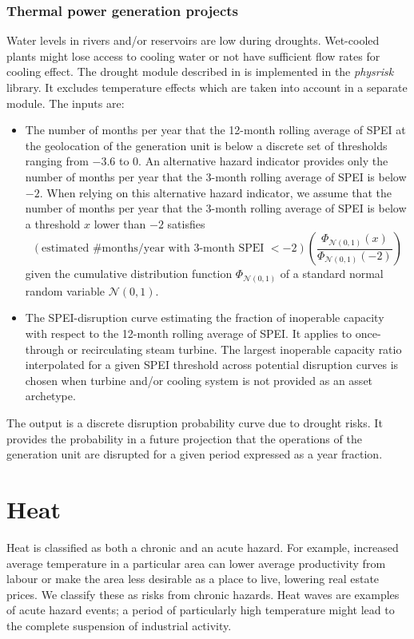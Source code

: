\documentclass[a4paper,11pt]{extarticle} %
\theoremstyle{definition}
\begin{document}
\subsubsection{Thermal power generation projects}
Water levels in rivers and/or reservoirs are low during droughts. Wet-cooled plants might lose access to cooling water or not have sufficient flow rates for cooling effect. The drought module described in \cite{LuoEtAl:2021,LuoEtAl:2023} is implemented in the \emph{physrisk} library. It excludes temperature effects which are taken into account in a separate module. The inputs are:
\begin{itemize}
\item The number of months per year that the 12-month rolling average of SPEI at the geolocation of the generation unit is below a discrete set of thresholds ranging from $-3.6$ to $0$. An alternative hazard indicator provides only the number of months per year that the 3-month rolling average of SPEI is below $-2$. When relying on this alternative hazard indicator, we assume that the number of months per year that the 3-month rolling average of SPEI is below a threshold $x$ lower than $-2$ satisfies
$$
\left(\text{estimated \#months/year with 3-month SPEI $<-2$}\right)\left(\frac{\Phi_{\mathcal{N}\left(0,1\right)}\left(x\right)}{\Phi_{\mathcal{N}\left(0,1\right)}\left(-2\right)}\right)
$$
given the cumulative distribution function $\Phi_{\mathcal{N}\left(0,1\right)}$ of a standard normal random variable $\mathcal{N}\left(0,1\right)$.
\item The SPEI-disruption curve estimating the fraction of inoperable capacity with respect to the 12-month rolling average of SPEI. It applies to once-through or recirculating steam turbine. The largest inoperable capacity ratio interpolated for a given SPEI threshold across potential disruption curves is chosen when turbine and/or cooling system is not provided as an asset archetype.
\end{itemize}
The output is a discrete disruption probability curve due to drought risks. It provides the probability in a future projection that the operations of the generation unit are disrupted for a given period expressed as a year fraction.

\section{Heat}

Heat is classified as both a chronic and an acute hazard.  For example, increased average temperature in a particular area can lower average productivity from labour or make the area less desirable as a place to live, lowering real estate prices. We classify these as risks from chronic hazards. Heat waves are examples of acute hazard events; a period of particularly high temperature might lead to the complete suspension of industrial activity.
\end{document}
